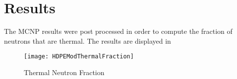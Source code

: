 \section{Results}

The MCNP results were post processed in order to compute the fraction of neutrons that are thermal.
The results are displayed in  
\begin{figure}[ht]
	\centering
	\texttt{[image: HDPEModThermalFraction]}
	  \caption{Thermal Neutron Fraction}
	  \label{fig:ThermalNeturonFraction}
\end{figure}
%
